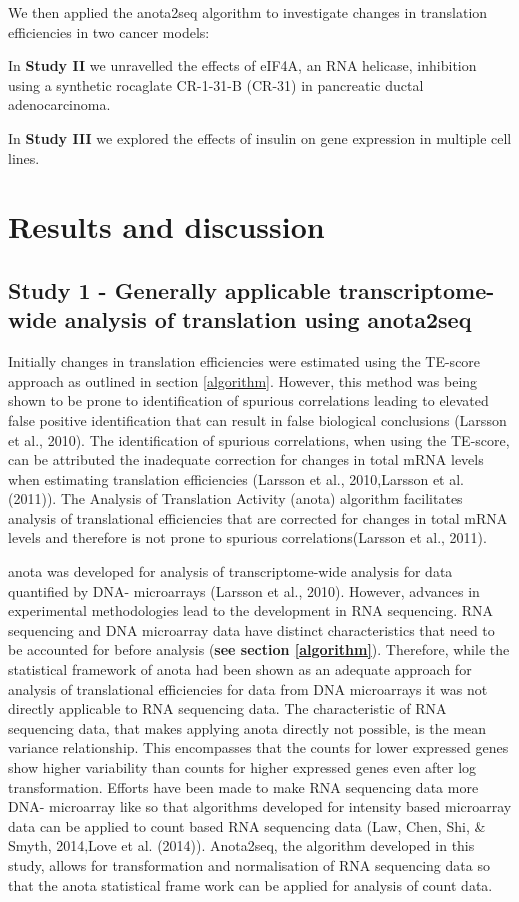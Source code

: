 \documentclass[12pt,openany]{book}
\begin{document}
We then applied the anota2seq algorithm to investigate changes in
translation efficiencies in two cancer models:

In \textbf{Study II} we unravelled the effects of eIF4A, an RNA
helicase, inhibition using a synthetic rocaglate CR-1-31-B (CR-31) in
pancreatic ductal adenocarcinoma.

In \textbf{Study III} we explored the effects of insulin on gene
expression in multiple cell lines.

\chapter{Results and discussion}

\section{Study 1 - Generally applicable transcriptome-wide analysis of translation using anota2seq}

Initially changes in translation efficiencies were estimated using the
TE-score approach as outlined in section \ref{algorithm}. However, this
method was being shown to be prone to identification of spurious
correlations leading to elevated false positive identification that can
result in false biological conclusions (Larsson et al., 2010). The
identification of spurious correlations, when using the TE-score, can be
attributed the inadequate correction for changes in total mRNA levels
when estimating translation efficiencies (Larsson et al., 2010,Larsson
et al. (2011)). The Analysis of Translation Activity (anota) algorithm
facilitates analysis of translational efficiencies that are corrected
for changes in total mRNA levels and therefore is not prone to spurious
correlations(Larsson et al., 2011).

anota was developed for analysis of transcriptome-wide analysis for data
quantified by DNA- microarrays (Larsson et al., 2010). However, advances
in experimental methodologies lead to the development in RNA sequencing.
RNA sequencing and DNA microarray data have distinct characteristics
that need to be accounted for before analysis (\textbf{see section
\ref{algorithm}}). Therefore, while the statistical framework of anota
had been shown as an adequate approach for analysis of translational
efficiencies for data from DNA microarrays it was not directly
applicable to RNA sequencing data. The characteristic of RNA sequencing
data, that makes applying anota directly not possible, is the mean
variance relationship. This encompasses that the counts for lower
expressed genes show higher variability than counts for higher expressed
genes even after log transformation. Efforts have been made to make RNA
sequencing data more DNA- microarray like so that algorithms developed
for intensity based microarray data can be applied to count based RNA
sequencing data (Law, Chen, Shi, \& Smyth, 2014,Love et al. (2014)).
Anota2seq, the algorithm developed in this study, allows for
transformation and normalisation of RNA sequencing data so that the
anota statistical frame work can be applied for analysis of count data.
\end{document}
